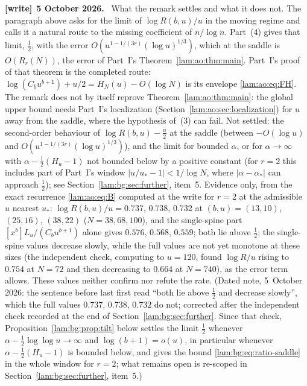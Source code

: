 \documentclass[11pt,a4paper]{article}
\numberwithin{equation}{section}
\theoremstyle{remark}
\newenvironment{writenote}[1][]{\par\smallskip\begingroup\small
 \noindent\textbf{[write]}\if\relax\detokenize{#1}\relax\else~\textbf{#1.}\fi\ }%
 {\par\endgroup\smallskip}
\begin{document}
\begin{writenote}[5 October 2026]
What the remark settles and what it does not. The paragraph above asks for the limit of $\log R(b,u)/u$ in the moving regime and calls it a natural route to the missing coefficient of $n/\log n$. Part~(4) gives that limit, $\frac12$, with the error $O(u^{1-1/(3r)}(\log u)^{1/3})$, which at the saddle is $O(R_r(N))$, the error of Part~I's Theorem~\ref{lam:ao:thm:main}. Part~I's proof of that theorem is the completed route: $\log(C_bu^{b+1})+u/2=H_N(u)-O(\log N)$ is its envelope \eqref{lam:ao:eq:FH}. The remark does not by itself reprove Theorem~\ref{lam:ao:thm:main}: the global upper bound needs Part~I's localization (Section~\ref{lam:ao:sec:localization}) for $u$ away from the saddle, where the hypothesis of~(3) can fail. Not settled: the second-order behaviour of $\log R(b,u)-\frac u2$ at the saddle (between $-O(\log u)$ and $O(u^{1-1/(3r)}(\log u)^{1/3})$), and the limit for bounded $\alpha$, or for $\alpha\to\infty$ with $\alpha-\frac12(H_u-1)$ not bounded below by a positive constant (for $r=2$ this includes part of Part~I's window $|u/u_*-1|<1/\log N$, where $|\alpha-\alpha_*|$ can approach $\frac12$); see Section~\ref{lam:bg:sec:further}, item~5. Evidence only, from the exact recurrence \eqref{lam:ao:eq:B} computed at the write for $r=2$ at the admissible $u$ nearest $u_*$: $\log R(b,u)/u=0.737$, $0.738$, $0.732$ at $(b,u)=(13,10)$, $(25,16)$, $(38,22)$ ($N=38,68,100$), and the single-spine part $[x^b]L_u/(C_bu^{b+1})$ alone gives $0.576$, $0.568$, $0.559$; both lie above $\frac12$; the single-spine values decrease slowly, while the full values are not yet monotone at these sizes (the independent check, computing to $u=120$, found $\log R/u$ rising to $0.754$ at $N=72$ and then decreasing to $0.664$ at $N=740$), as the error term allows. These values neither confirm nor refute the rate. (Dated note, 5~October 2026: the sentence before last first read ``both lie above $\frac12$ and decrease slowly'', which the full values $0.737$, $0.738$, $0.732$ do not; corrected after the independent check recorded at the end of Section~\ref{lam:bg:sec:further}. Since that check, Proposition~\ref{lam:bg:prop:tilt} below settles the limit $\frac12$ whenever $\alpha-\frac12\log\log u\to\infty$ and $\log(b+1)=o(u)$, in particular whenever $\alpha-\frac12(H_u-1)$ is bounded below, and gives the bound \eqref{lam:bg:eq:ratio-saddle} in the whole window for $r=2$; what remains open is re-scoped in Section~\ref{lam:bg:sec:further}, item~5.)
\end{writenote}
\end{document}
